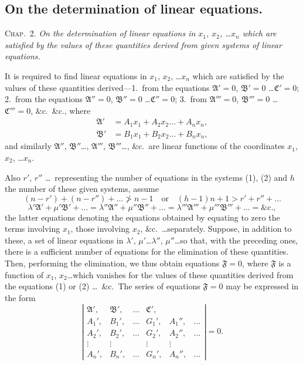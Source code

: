 \documentclass[11pt,a4paper]{book}
\begin{document}
\newpage
\subsection{On the determination of linear equations.}

\textsc{Chap.\ 2.} \textit{On the determination of linear equations in $x_1$, $x_2$, \ldots $x_n$ which are
satisfied by the values of these quantities derived from given systems of linear equations.}

It is required to find linear equations in $x_1$, $x_2$, \ldots $x_n$ which are satisfied by the values
of these quantities derived---1.\ from the equations $\mathfrak{A}'=0$, $\mathfrak{B}'=0$ \ldots $\mathfrak{C}'=0$;
2.\ from the equations $\mathfrak{A}''=0$, $\mathfrak{B}''=0$ \ldots $\mathfrak{C}''=0$;
3.\ from $\mathfrak{A}'''=0$, $\mathfrak{B}'''=0$ \ldots $\mathfrak{C}'''=0$, \&c.\ \&c., where
\begin{align*}
\mathfrak{A}' &= A_1 x_1 + A_2 x_2 \ldots + A_n x_n \tag{1},\\
\mathfrak{B}' &= B_1 x_1 + B_2 x_2 \ldots + B_n x_n,
\end{align*}
and similarly $\mathfrak{A}''$, $\mathfrak{B}''$\ldots, $\mathfrak{A}'''$, $\mathfrak{B}'''$\ldots, \&c.\ are linear functions of the coordinates $x_1$, $x_2$, \ldots $x_n$.

Also $r'$, $r''$ \ldots\ representing the number of equations in the systems (1), (2)
and $h$ the number of these given systems, assume
\[
(n-r') + (n-r'') + \ldots \not> n-1 \quad \text{or} \quad (h-1)n+1 > r' + r'' + \ldots
\]
\[
\lambda' \mathfrak{A}' + \mu' \mathfrak{B}' + \ldots = \lambda'' \mathfrak{A}'' + \mu'' \mathfrak{B}'' + \ldots = \lambda''' \mathfrak{A}''' + \mu''' \mathfrak{B}''' + \ldots = \text{\&c.}
\tag{2},
\]
the latter equations denoting the equations obtained by equating to zero the terms
involving $x_1$, those involving $x_2$, \&c.\ \ldots separately. Suppose, in addition to these, a
set of linear equations in $\lambda'$, $\mu'$\ldots $\lambda''$, $\mu''$\ldots so that, with the preceding ones, there
is a sufficient number of equations for the elimination of these quantities. Then,
performing the elimination, we thus obtain equations $\mathfrak{F}=0$, where $\mathfrak{F}$ is a function of
$x_1$, $x_2$\ldots which vanishes for the values of these quantities derived from the equations
(1) or (2) \ldots\ \&c.\ The series of equations $\mathfrak{F}=0$ may be expressed in the form
\[
\left|
\begin{array}{cccccc}
\mathfrak{A}', & \mathfrak{B}', & \ldots & \mathfrak{C}', & & \\
A_1', & B_1', & \ldots & G_1', & A_1'', & \ldots \\
A_2', & B_2', & \ldots & G_2', & A_2'', & \ldots \\
\vdots & \vdots & & \vdots & \vdots & \\
A_n', & B_n', & \ldots & G_n', & A_n'', & \ldots
\end{array}
\right| = 0
\tag{3}.
\]
\end{document}

